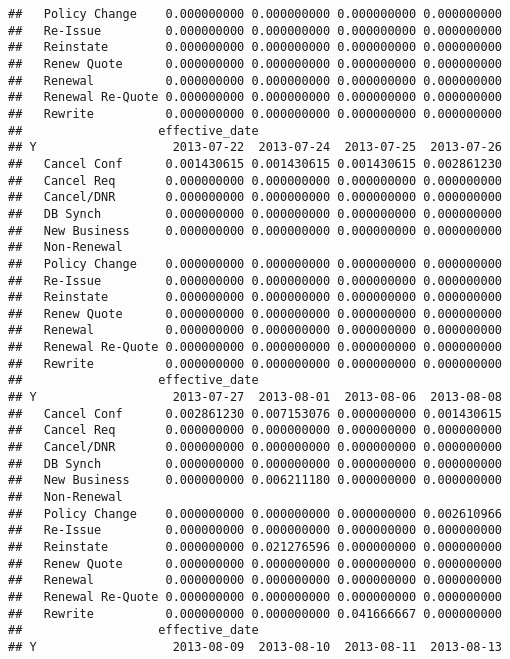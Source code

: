 \documentclass[]{article}
\begin{document}
\begin{verbatim}
##   Policy Change    0.000000000 0.000000000 0.000000000 0.000000000
##   Re-Issue         0.000000000 0.000000000 0.000000000 0.000000000
##   Reinstate        0.000000000 0.000000000 0.000000000 0.000000000
##   Renew Quote      0.000000000 0.000000000 0.000000000 0.000000000
##   Renewal          0.000000000 0.000000000 0.000000000 0.000000000
##   Renewal Re-Quote 0.000000000 0.000000000 0.000000000 0.000000000
##   Rewrite          0.000000000 0.000000000 0.000000000 0.000000000
##                   effective_date
## Y                   2013-07-22  2013-07-24  2013-07-25  2013-07-26
##   Cancel Conf      0.001430615 0.001430615 0.001430615 0.002861230
##   Cancel Req       0.000000000 0.000000000 0.000000000 0.000000000
##   Cancel/DNR       0.000000000 0.000000000 0.000000000 0.000000000
##   DB Synch         0.000000000 0.000000000 0.000000000 0.000000000
##   New Business     0.000000000 0.000000000 0.000000000 0.000000000
##   Non-Renewal                                                     
##   Policy Change    0.000000000 0.000000000 0.000000000 0.000000000
##   Re-Issue         0.000000000 0.000000000 0.000000000 0.000000000
##   Reinstate        0.000000000 0.000000000 0.000000000 0.000000000
##   Renew Quote      0.000000000 0.000000000 0.000000000 0.000000000
##   Renewal          0.000000000 0.000000000 0.000000000 0.000000000
##   Renewal Re-Quote 0.000000000 0.000000000 0.000000000 0.000000000
##   Rewrite          0.000000000 0.000000000 0.000000000 0.000000000
##                   effective_date
## Y                   2013-07-27  2013-08-01  2013-08-06  2013-08-08
##   Cancel Conf      0.002861230 0.007153076 0.000000000 0.001430615
##   Cancel Req       0.000000000 0.000000000 0.000000000 0.000000000
##   Cancel/DNR       0.000000000 0.000000000 0.000000000 0.000000000
##   DB Synch         0.000000000 0.000000000 0.000000000 0.000000000
##   New Business     0.000000000 0.006211180 0.000000000 0.000000000
##   Non-Renewal                                                     
##   Policy Change    0.000000000 0.000000000 0.000000000 0.002610966
##   Re-Issue         0.000000000 0.000000000 0.000000000 0.000000000
##   Reinstate        0.000000000 0.021276596 0.000000000 0.000000000
##   Renew Quote      0.000000000 0.000000000 0.000000000 0.000000000
##   Renewal          0.000000000 0.000000000 0.000000000 0.000000000
##   Renewal Re-Quote 0.000000000 0.000000000 0.000000000 0.000000000
##   Rewrite          0.000000000 0.000000000 0.041666667 0.000000000
##                   effective_date
## Y                   2013-08-09  2013-08-10  2013-08-11  2013-08-13

\end{verbatim}
\end{document}

